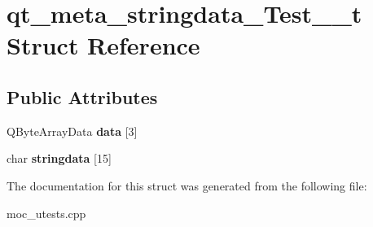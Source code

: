 \hypertarget{structqt__meta__stringdata__Test__1__t}{\section{qt\-\_\-meta\-\_\-stringdata\-\_\-\-Test\-\_\-\_\-t Struct Reference}
\label{structqt__meta__stringdata__Test__1__t}
}
\subsection*{Public Attributes}
\begin{DoxyCompactItemize}
\item 
\hypertarget{structqt__meta__stringdata__Test__1__t_a5aabbfb6f181753ba83ec53c74f32f8e}{Q\-Byte\-Array\-Data {\bfseries data} \mbox{[}3\mbox{]}}\label{structqt__meta__stringdata__Test__1__t_a5aabbfb6f181753ba83ec53c74f32f8e}

\item 
\hypertarget{structqt__meta__stringdata__Test__1__t_a7d707da83f695db1d610b3eb698f7b07}{char {\bfseries stringdata} \mbox{[}15\mbox{]}}\label{structqt__meta__stringdata__Test__1__t_a7d707da83f695db1d610b3eb698f7b07}

\end{DoxyCompactItemize}


The documentation for this struct was generated from the following file\-:\begin{DoxyCompactItemize}
\item 
moc\-\_\-utests.\-cpp\end{DoxyCompactItemize}
